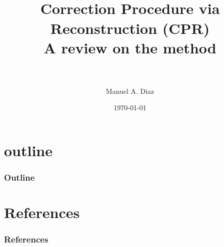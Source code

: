 

\title[CPR Review \hspace{4em}\insertframenumber/\inserttotalframenumber]{~ \\ Correction Procedure via Reconstruction (CPR)\\ A review on the method \\~} %
\author[Aerodynamic Design \& Analysis Lab]{ Manuel A. Diaz} %
\date{\today}



\begin{frame}
	\maketitle
\end{frame}

\section*{outline}
\begin{frame} \frametitle{Outline}
	\tableofcontents
\end{frame}







%







\section{References}

\begin{frame}[allowframebreaks]
	\frametitle{References}
	
	
\end{frame}


